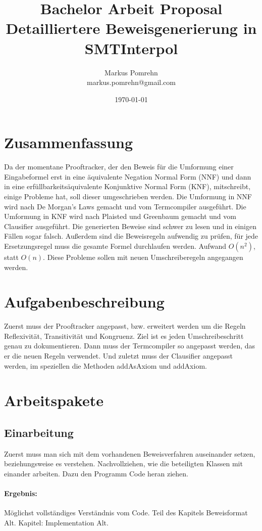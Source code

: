 \documentclass[a4paper]{article}
\title{Bachelor Arbeit Proposal\\
  Detailliertere Beweisgenerierung in SMTInterpol
}
\author{Markus Pomrehn\\{markus.pomrehn@gmail.com}}
\date{\today}
\begin{document}
\maketitle

\section{Zusammenfassung}

Da der momentane Prooftracker, der den Beweis für die Umformung einer Eingabeformel erst in eine äquivalente Negation Normal Form (NNF) und dann in eine erfüllbarkeitsäquivalente Konjunktive Normal Form (KNF), mitschreibt, einige Probleme hat, soll dieser umgeschrieben werden.
Die Umformung in NNF wird nach De Morgan's Laws gemacht und vom Termcompiler ausgeführt.
Die Umformung in KNF wird nach Plaisted und Greenbaum gemacht und vom Clausifier ausgeführt.
Die generierten Beweise sind schwer zu lesen und in einigen Fällen sogar falsch.
Außerdem sind die Beweisregeln aufwendig zu prüfen, für jede Ersetzungsregel muss die gesamte Formel durchlaufen werden.
Aufwand $O(n^2)$, statt $O(n)$. Diese Probleme sollen mit neuen Umschreiberegeln angegangen werden.

\section{Aufgabenbeschreibung}

Zuerst muss der Prooftracker angepasst, bzw. erweitert werden um die Regeln Reflexivität, Transitivität und Kongruenz.
Ziel ist es jeden Umschreibeschritt genau zu dokumentieren.
Dann muss der Termcompiler so angepasst werden, das er die neuen Regeln verwendet.
Und zuletzt muss der Clausifier angepasst werden, im speziellen die Methoden addAsAxiom und addAxiom.

\section{Arbeitspakete}

\subsection{Einarbeitung}

Zuerst muss man sich mit dem vorhandenen Beweisverfahren auseinander setzen, beziehungsweise es verstehen.
Nachvollziehen, wie die beteiligten Klassen mit einander arbeiten.
Dazu den Programm Code heran ziehen.

\paragraph{Ergebnis:}
Möglichst vollständiges Verständnis vom Code.
Teil des Kapitels Beweisformat Alt.
Kapitel: Implementation Alt.
\end{document}
